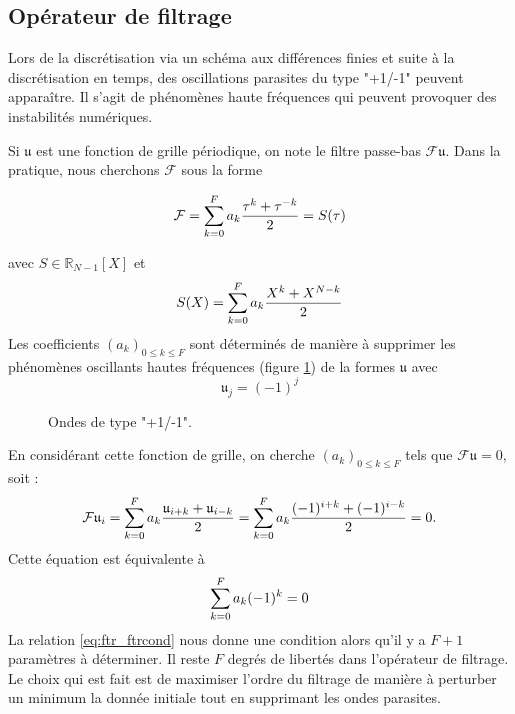 \subsection{Opérateur de filtrage}


Lors de la discrétisation via un schéma aux différences finies et suite à la discrétisation en temps, des oscillations parasites du type "+1/-1" peuvent apparaître. Il s'agit de phénomènes haute fréquences qui peuvent provoquer des instabilités numériques. 

Si $\mathfrak{u}$ est une fonction de grille périodique, on note le filtre passe-bas $\mathcal{F}\mathfrak{u}$. Dans la pratique, nous cherchons $\mathcal{F}$ sous la forme 

\begin{equation}
\mathcal{F} = \displaystyle\sum\limits_{k=0}^F a_k \dfrac{\tau^k + \tau^{-k}}{2} = S(\tau)
\label{eq:ftr}
\end{equation}

avec $S \in \mathbb{R}_{N-1}[X]$ et 
\begin{equation}
S(X) = \displaystyle\sum\limits_{k=0}^F a_k \dfrac{X^k + X^{N-k}}{2}
\label{eq:pol_filtrage}
\end{equation}
Les coefficients $(a_k)_{0 \leq k \leq F}$ sont déterminés de manière à supprimer les phénomènes oscillants hautes fréquences (figure \ref{fig:hf_waves}) de la formes $\mathfrak{u}$ avec 
\begin{equation}
\mathfrak{u}_j = (-1)^j
\end{equation}

\begin{figure}[htbp]
\begin{center}
\end{center}
\caption{Ondes de type "+1/-1".}
\label{fig:hf_waves}
\end{figure}


En considérant cette fonction de grille, on cherche $(a_k)_{0\leq k \leq F}$ tels que $\mathcal{F} \mathfrak{u} = \mathfrak{0}$, soit :
\begin{equation}
\mathcal{F}\mathfrak{u}_i = \displaystyle\sum\limits_{k=0}^F a_k \dfrac{\mathfrak{u}_{i+k} + \mathfrak{u}_{i-k}}{2} = \displaystyle\sum\limits_{k=0}^F a_k  \dfrac{(-1)^{i+k} + (-1)^{i-k}}{2} = 0.
\end{equation}
Cette équation est équivalente à 
\begin{equation}
\displaystyle\sum\limits_{k=0}^F a_k (-1)^k = 0
\label{eq:ftr_ftrcond}
\end{equation}
La relation \eqref{eq:ftr_ftrcond} nous donne une condition alors qu'il y a $F+1$ paramètres à déterminer. Il reste $F$ degrés de libertés dans l'opérateur de filtrage. Le choix qui est fait est de maximiser l'ordre du filtrage de manière à perturber un minimum la donnée initiale tout en supprimant les ondes parasites.

